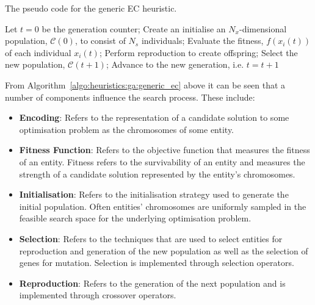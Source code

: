 \begin{algorithm}[H]
      \caption{The pseudo code for the generic \acs{EC} heuristic.}
      \label{algo:heuristics:ga:generic_ec}
      \begin{algorithmic}
            \State Let $t = 0$ be the generation counter;
            \State Create an initialise an $N_{x}$-dimensional population, $\mathcal{C}(0)$, to consist of $N_{s}$ individuals;
            \State Evaluate the fitness, $f(x_{i}(t))$ of each individual $x_{i}(t)$;
            \State Perform reproduction to create offspring;
            \State Select the new population, $\mathcal{C}(t+1)$;
            \State Advance to the new generation, i.e. $t = t + 1$
            \EndWhile
            \State
      \end{algorithmic}
\end{algorithm}

From Algorithm~\ref{algo:heuristics:ga:generic_ec} above it can be seen that a number of components influence the search process. These include:

\begin{itemize}
      \item \textbf{Encoding}: Refers to the representation of a candidate solution to some optimisation problem as the chromosomes of some entity.

      \item \textbf{Fitness Function}: Refers to the objective function that measures the fitness of an entity. Fitness refers to the survivability of an entity and measures the strength of a candidate solution represented by the entity's chromosomes.

      \item \textbf{Initialisation}: Refers to the initialisation strategy used to generate the initial population. Often entities' chromosomes are uniformly sampled in the feasible search space for the underlying optimisation problem.

      \item \textbf{Selection}: Refers to the techniques that are used to select entities for reproduction and generation of the new population as well as the selection of genes for mutation. Selection is implemented through selection operators.

      \item \textbf{Reproduction}: Refers to the generation of the next population and is implemented through crossover operators.
\end{itemize}

